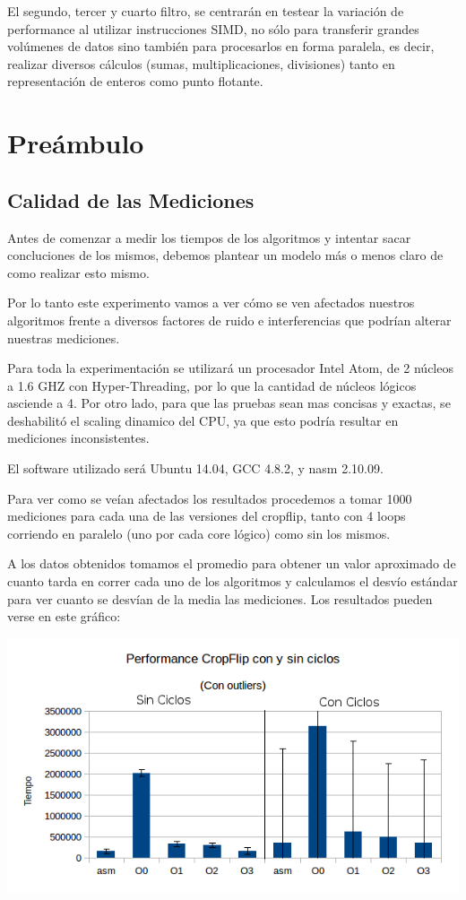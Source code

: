 \documentclass[a4paper]{article}
\begin{document}
El segundo, tercer y cuarto filtro, se centrarán en testear la variación de performance al utilizar instrucciones SIMD, no sólo para transferir grandes volúmenes de datos sino también para procesarlos en forma paralela, es decir, realizar diversos cálculos (sumas, multiplicaciones, divisiones) tanto en representación de enteros como punto flotante.

\newpage
\section{Preámbulo}

\subsection{Calidad de las Mediciones}

Antes de comenzar a medir los tiempos de los algoritmos y intentar sacar concluciones de los mismos, debemos plantear un modelo más o menos claro de como realizar esto mismo.  

Por lo tanto este experimento vamos a ver cómo se ven afectados nuestros algoritmos frente a diversos factores de ruido e interferencias que podrían alterar nuestras mediciones.

Para toda la experimentación se utilizará un procesador Intel Atom, de 2 núcleos a 1.6 GHZ con Hyper-Threading, por lo que la cantidad de núcleos lógicos asciende a 4. Por otro lado, para que las pruebas sean mas concisas y exactas, se deshabilitó el scaling dinamico del CPU, ya que esto podría resultar en mediciones inconsistentes. 

El software utilizado será Ubuntu 14.04, GCC 4.8.2, y nasm 2.10.09.

Para ver como se veían afectados los resultados procedemos a tomar 1000 mediciones para cada una de las versiones del cropflip, tanto con 4 loops corriendo en paralelo (uno por cada core lógico) como sin los mismos.

A los datos obtenidos tomamos el promedio para obtener un valor aproximado de cuanto tarda en correr cada uno de los algoritmos y calculamos el desvío estándar para ver cuanto se desvían de la media las mediciones. Los resultados pueden verse en este gráfico:

\begin{center}
  \includegraphics[scale=0.66]{Graficos1.4/1.3/perConOut.png}
\end{center}
\end{document}
